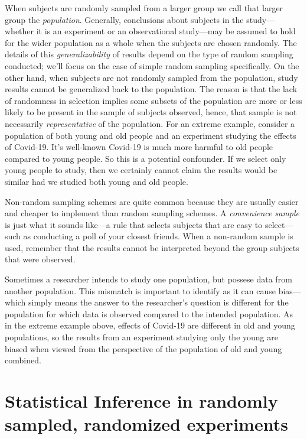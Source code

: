 \documentclass[]{book}
\begin{document}
When subjects are randomly sampled from a larger group we call that
larger group the \emph{population}. Generally, conclusions about
subjects in the study---whether it is an experiment or an observational
study---may be assumed to hold for the wider population as a whole when
the subjects are chosen randomly. The details of this
\emph{generalizability} of results depend on the type of random sampling
conducted; we'll focus on the case of simple random sampling
specifically. On the other hand, when subjects are not randomly sampled
from the population, study results cannot be generalized back to the
population. The reason is that the lack of randomness in selection
implies some subsets of the population are more or less likely to be
present in the sample of subjects observed, hence, that sample is not
necessarily \emph{representative} of the population. For an extreme
example, consider a population of both young and old people and an
experiment studying the effects of Covid-19. It's well-known Covid-19 is
much more harmful to old people compared to young people. So this is a
potential confounder. If we select only young people to study, then we
certainly cannot claim the results would be similar had we studied both
young and old people.

Non-random sampling schemes are quite common because they are usually
easier and cheaper to implement than random sampling schemes. A
\emph{convenience sample} is just what it sounds like---a rule that
selects subjects that are easy to select---such as conducting a poll of
your closest friends. When a non-random sample is used, remember that
the results cannot be interpreted beyond the group subjects that were
observed.

Sometimes a researcher intends to study one population, but possese data
from another population. This mismatch is important to identify as it
can cause bias---which simply means the answer to the researcher's
question is different for the population for which data is observed
compared to the intended population. As in the extreme example above,
effects of Covid-19 are different in old and young populations, so the
results from an experiment studying only the young are biased when
viewed from the perspective of the population of old and young combined.

\section{Statistical Inference in randomly sampled, randomized
experiments}\label{statistical-inference-in-randomly-sampled-randomized-experiments}
\end{document}
